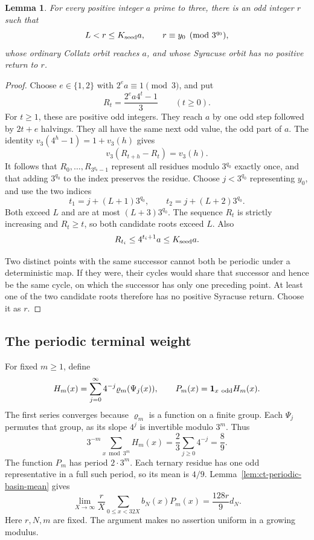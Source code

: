 \documentclass[11pt,a4paper]{article}
\newtheorem{lemma}[theorem]{Lemma}
\begin{document}
\begin{lemma}\label{lem:ct-bounded-nonreturning-seed}
For every positive integer \(a\) prime to three, there is an odd
integer \(r\) such that
\[
 L<r\le K_{\rm seed}a,\qquad r\equiv y_0\pmod{3^{q_0}},
\]
whose ordinary Collatz orbit reaches \(a\), and whose Syracuse
orbit has no positive return to \(r\).
\end{lemma}
\begin{proof}
Choose \(e\in\{1,2\}\) with \(2^ea\equiv1\pmod3\), and put
\[
 R_t=\frac{2^ea4^t-1}{3}\qquad(t\ge0).
\]
For \(t\ge1\), these are positive odd integers. They reach \(a\)
by one odd step followed by \(2t+e\) halvings. They all have the
same next odd value, the odd part of \(a\).
The identity
\(v_3(4^h-1)=1+v_3(h)\) gives
\[
 v_3(R_{t+h}-R_t)=v_3(h).
\]
It follows that \(R_0,\ldots,R_{3^{q_0}-1}\) represent all residues
modulo \(3^{q_0}\) exactly once, and that adding \(3^{q_0}\) to
the index preserves the residue. Choose \(j<3^{q_0}\) representing
\(y_0\), and use the two indices
\[
 t_1=j+(L+1)3^{q_0},\qquad
 t_2=j+(L+2)3^{q_0}.
\]
Both exceed \(L\) and are at most \((L+3)3^{q_0}\).
The sequence \(R_t\) is strictly increasing and \(R_t\ge t\), so
both candidate roots exceed \(L\). Also
\[
 R_{t_i}\le4^{t_i+1}a\le K_{\rm seed}a.
\]

Two distinct points with the same successor cannot both be periodic
under a deterministic map. If they were, their cycles would share
that successor and hence be the same cycle, on which the successor
has only one preceding point. At least one of the two candidate
roots therefore has no positive Syracuse return. Choose it as \(r\).
\end{proof}

\subsection{The periodic terminal weight}

For fixed \(m\ge1\), define
\[
 H_m(x)=\sum_{j=0}^{\infty}4^{-j}\varrho_m(\Psi_j(x)),\qquad
 P_m(x)=\mathbf1_{x\ {\rm odd}}H_m(x).
\]
The first series converges because \(\varrho_m\) is a function on
a finite group. Each \(\Psi_j\) permutes that group, as its slope
\(4^j\) is invertible modulo \(3^m\). Thus
\begin{equation}\label{eq:ct-terminal-fan-mean}
 3^{-m}\sum_{x\bmod3^m}H_m(x)
       =\frac23\sum_{j\ge0}4^{-j}=\frac89.
\end{equation}
The function \(P_m\) has period \(2\cdot3^m\). Each ternary
residue has one odd representative in a full such period, so its
mean is \(4/9\). Lemma~\ref{lem:ct-periodic-basin-mean} gives
\begin{equation}\label{eq:ct-terminal-fan-basin-limit}
 \lim_{X\to\infty}\frac rX\sum_{0\le x<32X}b_N(x)P_m(x)
       =\frac{128r}{9}d_N.
\end{equation}
Here \(r,N,m\) are fixed. The argument makes no assertion uniform
in a growing modulus.
\end{document}
